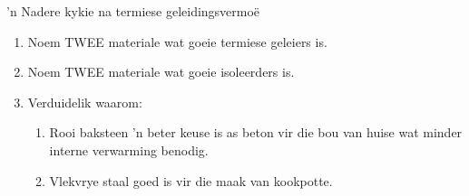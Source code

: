 \begin{Investigation}{ 'n Nadere kykie na termiese geleidingsvermo\"e}
{      \label{m38706*id67013}\begin{enumerate}[noitemsep, label=\textbf{\arabic*}. ] 
            \label{m38706*uid105}\item Noem TWEE materiale wat goeie termiese geleiers is.
\label{m38706*uid106}\item Noem TWEE materiale wat goeie isoleerders is.
\label{m38706*uid107}\item Verduidelik waarom:
\label{m38706*id67053}\begin{enumerate}[noitemsep, label=\textbf{\alph*}. ] 
            \label{m38706*uid108}\item Rooi baksteen 'n beter keuse is as beton vir die bou van huise wat minder interne verwarming benodig.
\label{m38706*uid109}\item Vlekvrye staal goed is vir die maak van kookpotte.
\end{enumerate}
        \end{enumerate}}
\end{Investigation}
\label{m38706*notfhsst!!!underscore!!!id564}
	\par
    \label{m38706*cid8}
